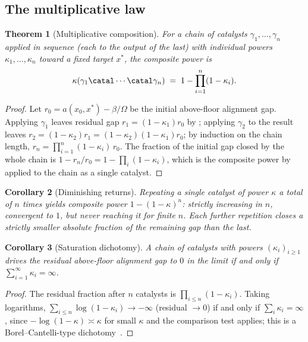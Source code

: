 \documentclass[11pt,twocolumn,a4paper]{article}
\theoremstyle{thmstyle}
\newtheorem{theorem}{Theorem}[section]
\newtheorem{corollary}[theorem]{Corollary}
\theoremstyle{definition}
\theoremstyle{remark}
\newcommand{\flo}{\beta}
\newcommand{\pot}{\kappa}
\begin{document}
\subsection{The multiplicative law}

\begin{theorem}[Multiplicative composition]
\label{thm:multiplicative}
For a chain of catalysts $\gamma_1,\dots,\gamma_n$ applied in sequence
(each to the output of the last) with individual powers
$\pot_1,\dots,\pot_n$ toward a fixed target $x^{\ast}$, the composite power
is
\[
\pot(\gamma_1\catal\cdots\catal\gamma_n)
\;=\;1-\prod_{i=1}^{n}(1-\pot_i).
\]
\end{theorem}

\begin{proof}
Let $r_0=a(x_0,x^{\ast})-\flo/\Omega$ be the initial above-floor alignment
gap. Applying $\gamma_1$ leaves residual gap $r_1=(1-\pot_1)r_0$ by
; applying $\gamma_2$ to the result leaves
$r_2=(1-\pot_2)r_1=(1-\pot_2)(1-\pot_1)r_0$; by induction on the chain
length, $r_n=\prod_{i=1}^{n}(1-\pot_i)\,r_0$. The fraction of the initial
gap closed by the whole chain is $1-r_n/r_0=1-\prod_i(1-\pot_i)$, which is
the composite power by  applied to the chain as a single
catalyst.
\end{proof}

\begin{corollary}[Diminishing returns]
\label{cor:diminishing}
Repeating a single catalyst of power $\pot$ a total of $n$ times yields
composite power $1-(1-\pot)^n$: strictly increasing in $n$, convergent to
$1$, but never reaching it for finite $n$. Each further repetition closes
a strictly smaller absolute fraction of the remaining gap than the last.
\end{corollary}

\begin{corollary}[Saturation dichotomy]
\label{cor:saturation}
A chain of catalysts with powers $(\pot_i)_{i\ge1}$ drives the residual
above-floor alignment gap to $0$ in the limit if and only if
$\sum_{i=1}^{\infty}\pot_i=\infty$.
\end{corollary}

\begin{proof}
The residual fraction after $n$ catalysts is $\prod_{i\le n}(1-\pot_i)$.
Taking logarithms, $\sum_{i\le n}\log(1-\pot_i)\to-\infty$ (residual
$\to 0$) if and only if $\sum_i\pot_i=\infty$, since $-\log(1-\pot)\asymp
\pot$ for small $\pot$ and the comparison test applies; this is a
Borel--Cantelli-type dichotomy~\citep{borel1909,cantelli1917,%
williams1991probability}.
\end{proof}
\end{document}
